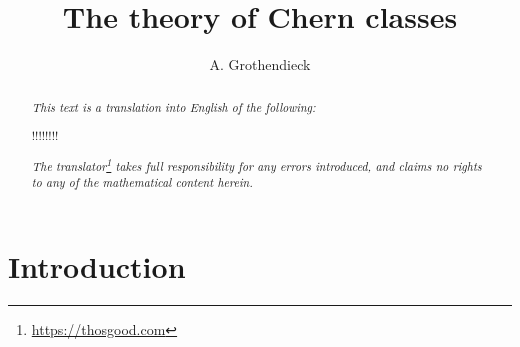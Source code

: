 \documentclass{article}
\title{The theory of Chern classes}
\author{A. Grothendieck}
\date{}
\newcommand{\oldpage}[1]{\marginpar{\footnotesize$\Big\vert$ \textit{p.~#1}}}
\begin{document}
\maketitle
\thispagestyle{fancy}

\renewcommand{\abstractname}{Translator's note.}

\begin{abstract}
  \renewcommand*{\thefootnote}{\fnsymbol{footnote}}
  \emph{This text is a translation into English of the following:}

  !!!!!!!!

  \emph{The translator\footnote{\url{https://thosgood.com}} takes full responsibility for any errors introduced, and claims no rights to any of the mathematical content herein.}
\end{abstract}

\setcounter{footnote}{0}

\tableofcontents



\providecommand{\HH}{\operatorname{H}}
\providecommand{\rank}{\operatorname{rank}}
\providecommand{\cl}{\operatorname{cl}}
\providecommand{\PP}{\mathbf{P}}

\providecommand{\scr}[1]{{\mathscr{#1}}}
\renewcommand{\cal}[1]{{\mathcal{#1}}}

\renewcommand{\geq}{\geqslant}
\renewcommand{\leq}{\leqslant}

\hypertarget{introduction}{%
\section*{Introduction}\label{introduction}}

\oldpage{137}
\end{document}
